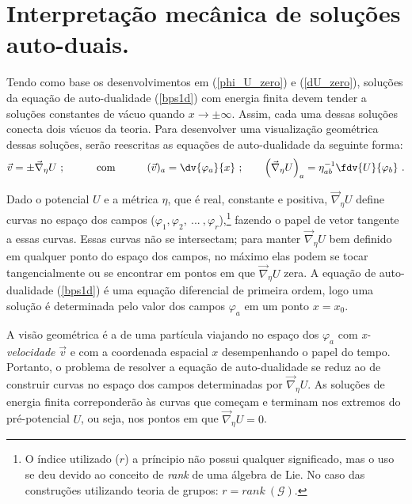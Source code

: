 \section{Interpretação mecânica de soluções auto-duais.}

Tendo como base os desenvolvimentos em (\ref{phi_U_zero}) e (\ref{dU_zero}), soluções da equação de auto-dualidade (\ref{bps1d}) com energia finita devem tender a soluções constantes de vácuo quando $x\rightarrow \pm \infty$. Assim, cada uma dessas soluções conecta dois vácuos da teoria. Para desenvolver uma visualização geométrica dessas soluções, serão reescritas as equações de auto-dualidade da seguinte forma:
\begin{equation}
    \Vec{v} = \pm \Vec{\nabla}_{\eta}U \ ; \quad \quad \quad \text{com} \quad \quad \quad (\Vec{v})_a = \dv{\varphi_a}{x} \ ; \qquad \left(\Vec{\nabla}_{\eta}U \right)_a = \eta^{-1}_{ab} \fdv{U}{\varphi_b} \ .
\end{equation}

Dado o potencial $U$ e a métrica $\eta$, que é real, constante e positiva, $\Vec{\nabla}_\eta U$ define curvas no espaço dos campos ($\varphi_1, \varphi_2, \ ... \ , \varphi_r$),\footnote{O índice utilizado ($r$) a príncipio não possui qualquer significado, mas o uso se deu devido ao conceito de \textit{rank} de uma álgebra de Lie. No caso das construções utilizando teoria de grupos: $r = \textit{rank} \ (\mathcal{G}).$} fazendo o papel de vetor tangente a essas curvas. Essas curvas não se intersectam; para manter $\Vec{\nabla}_\eta U$ bem definido em qualquer ponto do espaço dos campos, no máximo elas podem se tocar tangencialmente ou se encontrar em pontos em que $\Vec{\nabla}_\eta U$ zera. A equação de auto-dualidade (\ref{bps1d}) é uma equação diferencial de primeira ordem, logo uma solução é determinada pelo valor dos campos $\varphi_a$ em um ponto $x = x_0$. 

A visão geométrica é a de uma partícula viajando no espaço dos $\varphi_a$ com \textit{x-velocidade} $\Vec{v}$ e com a coordenada espacial $x$ desempenhando o papel do tempo. Portanto, o problema de resolver a equação de auto-dualidade se reduz ao de construir curvas no espaço dos campos determinadas por $\Vec{\nabla}_\eta U$. As soluções de energia finita correponderão às curvas que começam e terminam nos extremos do pré-potencial $U$, ou seja, nos pontos em que $\Vec{\nabla}_\eta U = 0$.

